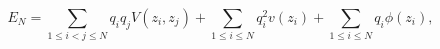 \begin{equation}
E_N=\sum_{1\le i<j\le N} q_iq_jV(z_i,z_j)+\sum_{1\le i\le N} q_i^2v(z_i)
+\sum_{1\le i\le N} q_i\phi(z_i),
\label{energy}
\end{equation}

